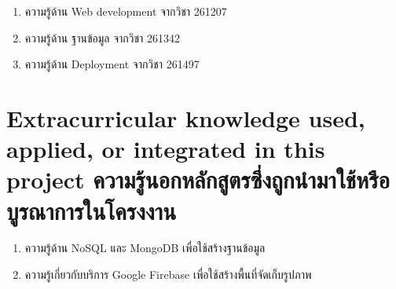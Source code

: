 \begin{enumerate}
  \item ความรู้ด้าน Web development จากวิชา 261207
  \item ความรู้ด้าน ฐานข้อมูล จากวิชา 261342
  \item ความรู้ด้าน Deployment จากวิชา 261497
\end{enumerate}

\section{\ifenglish%
Extracurricular knowledge used, applied, or integrated in this project
\else%
ความรู้นอกหลักสูตรซึ่งถูกนำมาใช้หรือบูรณาการในโครงงาน
\fi
}

\begin{enumerate}
  \item ความรู้ด้าน NoSQL และ MongoDB เพื่อใช้สร้างฐานข้อมูล
  \item ความรู้เกี่ยวกับบริการ Google Firebase เพื่อใช้สร้างพื้นที่จัดเก็บรูปภาพ
\end{enumerate}
